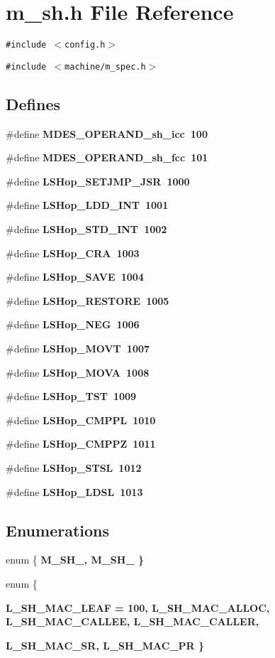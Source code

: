 \section{m\_\-sh.h File Reference}
\label{m__sh_8h}
{\tt \#include $<$config.h$>$}\par
{\tt \#include $<$machine/m\_\-spec.h$>$}\par
\subsection*{Defines}
\begin{CompactItemize}
\item 
\#define \bf{MDES\_\-OPERAND\_\-sh\_\-icc}~100
\item 
\#define \bf{MDES\_\-OPERAND\_\-sh\_\-fcc}~101
\item 
\#define \bf{LSHop\_\-SETJMP\_\-JSR}~1000
\item 
\#define \bf{LSHop\_\-LDD\_\-INT}~1001
\item 
\#define \bf{LSHop\_\-STD\_\-INT}~1002
\item 
\#define \bf{LSHop\_\-CRA}~1003
\item 
\#define \bf{LSHop\_\-SAVE}~1004
\item 
\#define \bf{LSHop\_\-RESTORE}~1005
\item 
\#define \bf{LSHop\_\-NEG}~1006
\item 
\#define \bf{LSHop\_\-MOVT}~1007
\item 
\#define \bf{LSHop\_\-MOVA}~1008
\item 
\#define \bf{LSHop\_\-TST}~1009
\item 
\#define \bf{LSHop\_\-CMPPL}~1010
\item 
\#define \bf{LSHop\_\-CMPPZ}~1011
\item 
\#define \bf{LSHop\_\-STSL}~1012
\item 
\#define \bf{LSHop\_\-LDSL}~1013
\end{CompactItemize}
\subsection*{Enumerations}
\begin{CompactItemize}
\item 
enum \{ \bf{M\_\-SH\_}, 
\bf{M\_\-SH\_}
 \}
\item 
enum \{ \par
\bf{L\_\-SH\_\-MAC\_\-LEAF} =  100, 
\bf{L\_\-SH\_\-MAC\_\-ALLOC}, 
\bf{L\_\-SH\_\-MAC\_\-CALLEE}, 
\bf{L\_\-SH\_\-MAC\_\-CALLER}, 
\par
\bf{L\_\-SH\_\-MAC\_\-SR}, 
\bf{L\_\-SH\_\-MAC\_\-PR}
 \}
\end{CompactItemize}
